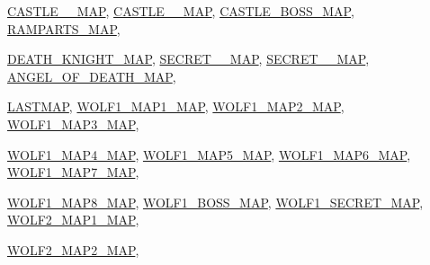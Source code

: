 \begin{DoxyCompactItemize}
\par
\hyperlink{MAPSSOD_8H_a1949852ef0462081a2b248dd4918bb86a28ed3377e1f3f1b3e58971f3ad0c309b}{CASTLE\_\_\-MAP}, 
\hyperlink{MAPSSOD_8H_a1949852ef0462081a2b248dd4918bb86a58f71fa3fe4e1ad30c5a546fb2578cca}{CASTLE\_\_\-MAP}, 
\hyperlink{MAPSSOD_8H_a1949852ef0462081a2b248dd4918bb86ad68686ecee4d7d189cdec24339752a68}{CASTLE\_\-BOSS\_\-MAP}, 
\hyperlink{MAPSSOD_8H_a1949852ef0462081a2b248dd4918bb86ad0e510da9b8efb0f2b66693c20aa707f}{RAMPARTS\_\-MAP}, 
\par
\hyperlink{MAPSSOD_8H_a1949852ef0462081a2b248dd4918bb86accd054d4f218acbd0d07ca579f25eec1}{DEATH\_\-KNIGHT\_\-MAP}, 
\hyperlink{MAPSSOD_8H_a1949852ef0462081a2b248dd4918bb86a21e21551ab169e7583e9a0078f657140}{SECRET\_\_\-MAP}, 
\hyperlink{MAPSSOD_8H_a1949852ef0462081a2b248dd4918bb86a8ae3d1e1bae75e006095c425cd8f5591}{SECRET\_\_\-MAP}, 
\hyperlink{MAPSSOD_8H_a1949852ef0462081a2b248dd4918bb86a33db57415abe5e9dd1cb669b00bb5b4d}{ANGEL\_\-OF\_\-DEATH\_\-MAP}, 
\par
\hyperlink{MAPSSOD_8H_a1949852ef0462081a2b248dd4918bb86ad3af5aeeef56724be68af11d0a6680b3}{LASTMAP}, 
\hyperlink{MAPSWL1_8H_a1949852ef0462081a2b248dd4918bb86a832a4584aa8b3c94cd186165008af81e}{WOLF1\_\-MAP1\_\-MAP}, 
\hyperlink{MAPSWL1_8H_a1949852ef0462081a2b248dd4918bb86ab3385d1f9ceae4fe5f683d14ad7dbeb1}{WOLF1\_\-MAP2\_\-MAP}, 
\hyperlink{MAPSWL1_8H_a1949852ef0462081a2b248dd4918bb86a058d20217d52b2ce66f382a84f532846}{WOLF1\_\-MAP3\_\-MAP}, 
\par
\hyperlink{MAPSWL1_8H_a1949852ef0462081a2b248dd4918bb86a4892b0039fbd140332561dd89194976f}{WOLF1\_\-MAP4\_\-MAP}, 
\hyperlink{MAPSWL1_8H_a1949852ef0462081a2b248dd4918bb86a4e0bde90495c18df66dc08481ea49be0}{WOLF1\_\-MAP5\_\-MAP}, 
\hyperlink{MAPSWL1_8H_a1949852ef0462081a2b248dd4918bb86ae26f3af31d4810858254489121a1cc4d}{WOLF1\_\-MAP6\_\-MAP}, 
\hyperlink{MAPSWL1_8H_a1949852ef0462081a2b248dd4918bb86a7f93aa33b8f8b41d2484854bac19541f}{WOLF1\_\-MAP7\_\-MAP}, 
\par
\hyperlink{MAPSWL1_8H_a1949852ef0462081a2b248dd4918bb86aa911f72afb434cee8a834bc5ebe10b90}{WOLF1\_\-MAP8\_\-MAP}, 
\hyperlink{MAPSWL1_8H_a1949852ef0462081a2b248dd4918bb86a4cc57d6fdbe6d4e0a703adaefaed0a6a}{WOLF1\_\-BOSS\_\-MAP}, 
\hyperlink{MAPSWL1_8H_a1949852ef0462081a2b248dd4918bb86a2e23490866f782ea85c5ad3a6c9e179f}{WOLF1\_\-SECRET\_\-MAP}, 
\hyperlink{MAPSWL1_8H_a1949852ef0462081a2b248dd4918bb86a8fba6738193812a52e4428cc41f3bac9}{WOLF2\_\-MAP1\_\-MAP}, 
\par
\hyperlink{MAPSWL1_8H_a1949852ef0462081a2b248dd4918bb86a6cb4b566b4502070219c855ee1d81bc4}{WOLF2\_\-MAP2\_\-MAP}, 

\end{DoxyCompactItemize}
